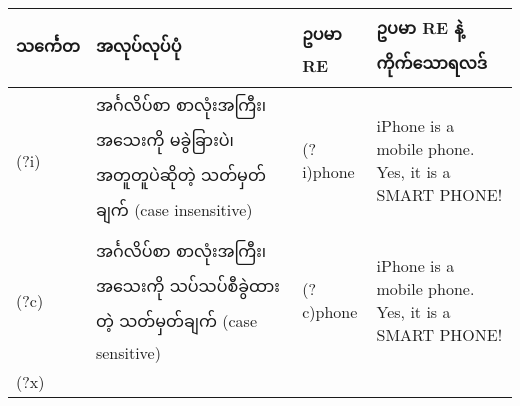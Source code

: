 \documentclass[11pt]{article}
\begin{document}
\begin{longtable}[c]{@{}llll@{}}
\toprule
\begin{minipage}[b]{0.12\columnwidth}\raggedright\strut
သင်္ကေတ
\strut\end{minipage} &
\begin{minipage}[b]{0.15\columnwidth}\raggedright\strut
အလုပ်လုပ်ပုံ
\strut\end{minipage} &
\begin{minipage}[b]{0.12\columnwidth}\raggedright\strut
ဥပမာ RE
\strut\end{minipage} &
\begin{minipage}[b]{0.12\columnwidth}\raggedright\strut
ဥပမာ RE နဲ့ ကိုက်သောရလဒ်
\strut\end{minipage}\tabularnewline
\midrule
\endhead
\begin{minipage}[t]{0.12\columnwidth}\raggedright\strut
(?i)
\strut\end{minipage} &
\begin{minipage}[t]{0.15\columnwidth}\raggedright\strut
အင်္ဂလိပ်စာ စာလုံးအကြီး၊ အသေးကို မခွဲခြားပဲ၊ အတူတူပဲဆိုတဲ့ သတ်မှတ်ချက်
(case insensitive)
\strut\end{minipage} &
\begin{minipage}[t]{0.12\columnwidth}\raggedright\strut
(?i)phone
\strut\end{minipage} &
\begin{minipage}[t]{0.12\columnwidth}\raggedright\strut
i{Phone} is a mobile {phone}. Yes, it is a SMART {PHONE}!
\strut\end{minipage}\tabularnewline
\begin{minipage}[t]{0.12\columnwidth}\raggedright\strut
(?c)
\strut\end{minipage} &
\begin{minipage}[t]{0.15\columnwidth}\raggedright\strut
အင်္ဂလိပ်စာ စာလုံးအကြီး၊ အသေးကို သပ်သပ်စီခွဲထားတဲ့ သတ်မှတ်ချက် (case
sensitive)
\strut\end{minipage} &
\begin{minipage}[t]{0.12\columnwidth}\raggedright\strut
(?c)phone
\strut\end{minipage} &
\begin{minipage}[t]{0.12\columnwidth}\raggedright\strut
iPhone is a mobile {phone}. Yes, it is a SMART PHONE!
\strut\end{minipage}\tabularnewline
\begin{minipage}[t]{0.12\columnwidth}\raggedright\strut
(?x)
\strut\end{minipage} &
\begin{minipage}[t]{0.15\columnwidth}\raggedright\strut

\end{minipage}
\end{longtable}
\end{document}
